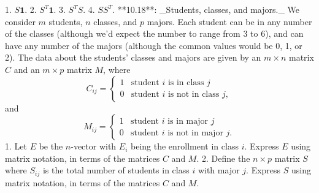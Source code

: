 1. \(S\mathbf{1}\).
2. \(S^{T}\mathbf{1}\).
3. \(S^{T}S\).
4. \(SS^{T}\).
**10.18**: _Students, classes, and majors._ We consider \(m\) students, \(n\) classes, and \(p\) majors. Each student can be in any number of the classes (although we'd expect the number to range from 3 to 6), and can have any number of the majors (although the common values would be 0, 1, or 2). The data about the students' classes and majors are given by an \(m\times n\) matrix \(C\) and an \(m\times p\) matrix \(M\), where \[C_{ij}=\left\{\begin{array}{ll}1&\text{student $i$ is in class $j$}\\ 0&\text{student $i$ is not in class $j$},\end{array}\right.\] and \[M_{ij}=\left\{\begin{array}{ll}1&\text{student $i$ is in major $j$}\\ 0&\text{student $i$ is not in major $j$}.\end{array}\right.\] 1. Let \(E\) be the \(n\)-vector with \(E_{i}\) being the enrollment in class \(i\). Express \(E\) using matrix notation, in terms of the matrices \(C\) and \(M\). 2. Define the \(n\times p\) matrix \(S\) where \(S_{ij}\) is the total number of students in class \(i\) with major \(j\). Express \(S\) using matrix notation, in terms of the matrices \(C\) and \(M\).

